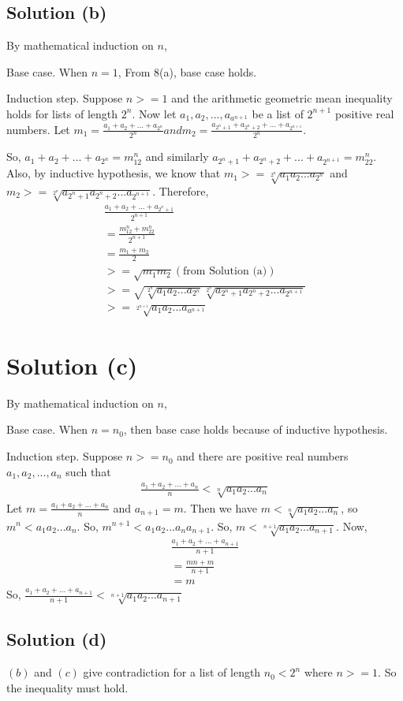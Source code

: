 \documentclass{article}
\begin{document}
\subsection{Solution (b)}
By mathematical induction on $n$,

Base case. When $n=1$, From 8(a), base case holds.

Induction step. Suppose $n>=1$ and the arithmetic geometric mean
inequality holds for lists of length $2^n$. Now let $a_1,a_2,...,
a_{a^{n+1}}$ be a list of $2^{n+1}$ positive real numbers. Let
$m_1 = \frac{a_1 + a_2 + ... + a_{2^n}}{2^n} and m_2 = \frac{a_{2^n +
    1} + a_{2^n + 2} + ... + a_{2^{n+1}}}{2^n}$.

So, $a_1 + a_2 + ... + a_{2^n} = m_12^n$ and similarly $a_{2^n + 1} +
a_{2^n + 2} + ... + a_{2^{n+1}} = m_22^n$. Also, by inductive
hypothesis, we know that $m_1 >= \sqrt[2^n]{a_1a_2...a_{2^n}}$ and
$m_2 >= \sqrt[2^n]{a_{2^n + 1}a_{2^n + 2}...a_{2^{n+1}} }$. Therefore,
\begin{align*}
  \frac{a_1 + a_2 + ... + a_{2^n + 1}}{2^{n+1}} \\
  = \frac{m_12^n + m_22^n}{2^{n+1}} \\
  = \frac{m_1 + m_2}{2} \\
  >= \sqrt{m_1m_2}   (\text{from Solution (a)}) \\
  >= \sqrt{\sqrt[2^n]{a_1a_2...a_{2^n}}\sqrt[2^n]{a_{2^n + 1}a_{2^n+2}...a_{2^{n+1}}}} \\
  >= \sqrt[2^{n+1}]{a_1a_2...a_{a^{n+1}}}
\end{align*}

\section{Solution (c)}
By mathematical induction on $n$,

Base case. When $n=n_0$, then base case holds because of inductive
hypothesis.

Induction step. Suppose $n >= n_0$ and there are positive real numbers
$a_1, a_2, ..., a_n$ such that
\begin{align*}
  \frac{a_1 + a_2 + ... + a_n}{n} < \sqrt[n]{a_1a_2...a_n}
\end{align*}
Let $m = \frac{a_1 + a_2 + ... + a_n}{n}$ and $a_{n+1} = m$. Then we
have $m < \sqrt[n]{a_1a_2...a_n}$, so $m^n < a_1a_2...a_n$. So,
$m^{n+1} < a_1a_2...a_na_{n+1}$. So, $m <
\sqrt[n+1]{a_1a_2...a_{n+1}}$. Now,
\begin{align*}
  \frac{a_1 + a_2 + ... + a_{n+1}}{n+1} \\
  = \frac{mn + m}{n+1} \\
  = m
\end{align*}
So, $\frac{a_1 + a_2 + ... + a_{n+1}}{n+1} <
\sqrt[n+1]{a_1a_2...a_{n+1}}$

\subsection{Solution (d)}
$(b)$ and $(c)$ give contradiction for a list of length $n_0 < 2^n$
where $n >= 1$. So the inequality must hold.
\end{document}
